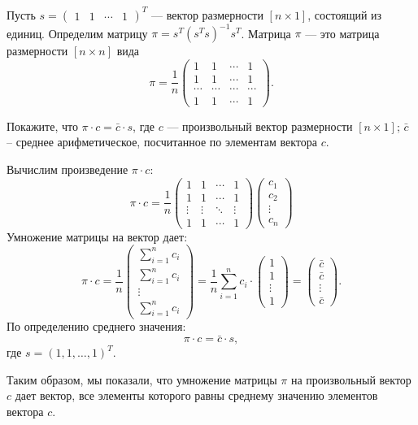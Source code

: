 \documentclass[12pt]{article}
\begin{document}
\begin{problem}
Пусть 
$s = 
 \begin{pmatrix}
  1 & 1 & \cdots & 1
 \end{pmatrix}^{T}$ — вектор размерности $[n \times 1]$, состоящий из единиц.
Определим матрицу $\pi = s^{T}(s^{T}s)^{-1}s^{T}$. Матрица $\pi$ — это матрица размерности $[n \times n]$ вида
\[
\pi = \frac{1}{n}
 \begin{pmatrix}
  1 & 1 & \cdots & 1\\
  1 & 1 & \cdots & 1\\
  \cdots & \cdots & \cdots & \cdots \\
  1 & 1 & \cdots & 1
 \end{pmatrix}.
 \]
 
Покажите, что $\pi \cdot c = \bar c \cdot s$, где $c$ — произвольный вектор размерности $[n \times 1]$; $\bar c$ – среднее арифметическое, посчитанное по элементам вектора $c$.
\end{problem}

\begin{sol}

Вычислим произведение $\pi \cdot c$:
\[
\pi \cdot c = \frac{1}{n} 
\begin{pmatrix} 
1 & 1 & \cdots & 1 \\
1 & 1 & \cdots & 1 \\
\vdots & \vdots & \ddots & \vdots \\
1 & 1 & \cdots & 1 
\end{pmatrix}
\begin{pmatrix} c_1 \\ c_2 \\ \vdots \\ c_n \end{pmatrix}
\]
Умножение матрицы на вектор дает:
\[
\pi \cdot c = \frac{1}{n} 
\begin{pmatrix} 
\sum_{i=1}^n c_i \\
\sum_{i=1}^n c_i \\
\vdots \\
\sum_{i=1}^n c_i 
\end{pmatrix}
= \frac{1}{n} \sum_{i=1}^n c_i \cdot 
\begin{pmatrix} 1 \\ 1 \\ \vdots \\ 1 \end{pmatrix} = 
\begin{pmatrix} \bar{c} \\ \bar{c} \\ \vdots \\ \bar{c} \end{pmatrix}.
\]
По определению среднего значения:
\[
\pi \cdot c = \bar{c} \cdot s,
\]
где $s = (1, 1, \dots, 1)^T$.

Таким образом, мы показали, что умножение матрицы $\pi$ на произвольный вектор $c$ дает вектор, все элементы которого равны среднему значению элементов вектора $c$.
\end{sol}
\end{document}
